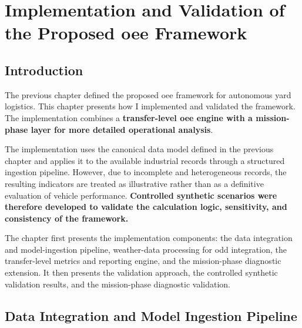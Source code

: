 \chapter{Implementation and Validation of the Proposed \texorpdfstring{\gls{oee}}{OEE} Framework}
\label{chap:oee-framework-implementation}

\newlength{\chapterThreeTextFloatSep}
\newlength{\chapterThreeFloatSep}
\newlength{\chapterThreeInTextSep}
\newlength{\chapterThreeAboveCaptionSkip}
\newlength{\chapterThreeBelowCaptionSkip}
\setlength{\chapterThreeTextFloatSep}{\textfloatsep}
\setlength{\chapterThreeFloatSep}{\floatsep}
\setlength{\chapterThreeInTextSep}{\intextsep}
\setlength{\chapterThreeAboveCaptionSkip}{\abovecaptionskip}
\setlength{\chapterThreeBelowCaptionSkip}{\belowcaptionskip}
\setlength{\textfloatsep}{10pt plus 2pt minus 2pt}
\setlength{\floatsep}{8pt plus 2pt minus 2pt}
\setlength{\intextsep}{10pt plus 2pt minus 2pt}
\setlength{\abovecaptionskip}{5pt}
\setlength{\belowcaptionskip}{2pt}

\section{Introduction}

The previous chapter defined the proposed \gls{oee} framework for autonomous yard logistics. This chapter presents how I implemented and validated the framework. The implementation combines a \textbf{transfer-level \gls{oee} engine with a mission-phase layer for more detailed operational analysis}.

The implementation uses the canonical data model defined in the previous chapter and applies it to the available industrial records through a structured ingestion pipeline. However, due to incomplete and heterogeneous records, the resulting indicators are treated as illustrative rather than as a definitive evaluation of vehicle performance. \textbf{Controlled synthetic scenarios were therefore developed to validate the calculation logic, sensitivity, and consistency of the framework.}

The chapter first presents the implementation components: the data integration and model-ingestion pipeline, weather-data processing for \gls{odd} integration, the transfer-level metrics and reporting engine, and the mission-phase diagnostic extension. It then presents the validation approach, the controlled synthetic validation results, and the mission-phase diagnostic validation.

\section{Data Integration and Model Ingestion Pipeline}
\label{sec:data-integration-and-model-ingestion-pipeline}

